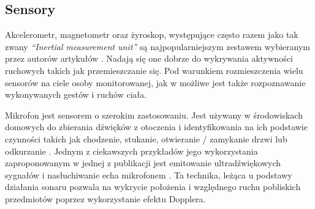 \subsection{Sensory}
Akcelerometr, magnetometr oraz żyroskop, występujące często razem jako tak zwany \textit{``Inertial measurement unit''} są najpopularniejszym zestawem wybieranym przez autorów artykułów \cite{S30, S32}. Nadają się one dobrze do wykrywania aktywności ruchowych takich jak przemieszczanie się. Pod warunkiem rozmieszczenia wielu sensorów na ciele osoby monitorowanej, jak w \cite{S29} możliwe jest także rozpoznawanie wykonywanych gestów i ruchów ciała.

Mikrofon jest sensorem o szerokim zastosowaniu. Jest używany w środowiskach domowych do zbierania dźwięków z otoczenia i identyfikowania na ich podstawie czynności takich jak chodzenie, stukanie, otwieranie / zamykanie drzwi lub odkurzanie \cite{S46}. Jednym z ciekawszych przykładów jego wykorzystania zaproponowanym w jednej z publikacji jest emitowanie ultradźwiękowych sygnałów i nasłuchiwanie echa mikrofonem \cite{S22}. Ta technika, leżąca u podstawy działania sonaru pozwala na wykrycie położenia i względnego ruchu pobliskich przedmiotów poprzez wykorzystanie efektu Dopplera.

